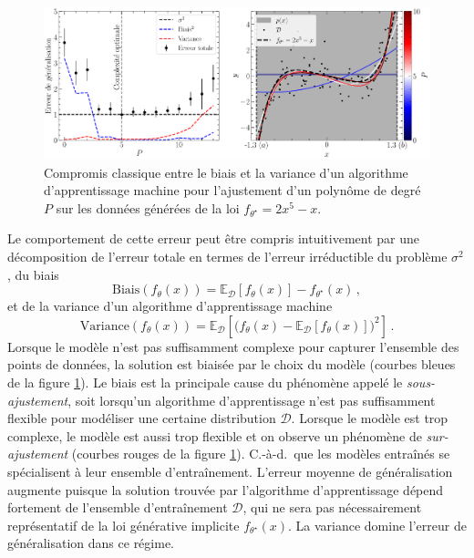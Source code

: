 \begin{figure}[ht!]
        \centering
        \includegraphics[width=\textwidth]{notebooks/bias_variance.pdf}
        \caption{Compromis classique entre le biais et la variance d'un algorithme d'apprentissage machine pour l'ajustement d'un polynôme de degré $P$ sur les données générées de la 
        loi $f_{\theta^\star} = 2x^5 - x$.}
        \label{fig:bias_variance}
\end{figure}

Le comportement de cette erreur 
peut être compris intuitivement par une décomposition de l'erreur totale en termes de l'erreur irréductible du problème 
$\sigma^2$, du biais 
\begin{equation}
        \mathrm{Biais}(f_{\theta}(x)) = \mathbb{E}_{\mathcal{D}}\left[ f_{\theta}(x)\right] - f_{\theta^{\star}}(x)\, ,
\end{equation} 
et de la variance d'un algorithme d'apprentissage machine 
\begin{equation}
       \mathrm{Variance}(f_\theta(x)) = \mathbb{E}_{\mathcal{D}}\left[ \big(f_{\theta}(x) - \mathbb{E}_{\mathcal{D}}\left[f_{\theta}(x) \right] \big)^2 \right]\, .
\end{equation} 
Lorsque le modèle n'est pas suffisamment complexe pour capturer l'ensemble des points de données, la solution est biaisée par le choix du modèle (courbes bleues de la 
figure \ref{fig:bias_variance}). Le biais est la principale cause du phénomène appelé le \textit{sous-ajustement}, soit lorsqu'un algorithme d'apprentissage n'est pas suffisamment 
flexible pour modéliser une certaine distribution $\mathcal{D}$. Lorsque le modèle est trop complexe, 
le modèle est aussi trop flexible et on observe un phénomène de \textit{sur-ajustement} (courbes rouges de la figure \ref{fig:bias_variance}). 
C.-à-d.~que les modèles entraînés se spécialisent à leur ensemble d'entraînement. 
L'erreur moyenne de généralisation augmente puisque la solution trouvée par l'algorithme d'apprentissage dépend fortement de l'ensemble d'entraînement $\mathcal{D}$, 
qui ne sera pas nécessairement représentatif de la loi générative implicite $f_{\theta^{\star}}(x)$. La variance domine l'erreur 
de généralisation dans ce régime.


